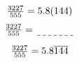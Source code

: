 \documentclass{article}
\newcommand{\wideunderline}[2][2em]{%
  \dashuline{\makebox[\ifdim\width>#1\width\else#1\fi]{#2}}%
}
\begin{document}
\begin{equation}
$$\frac{3227}{555} = 5.8(144)$$
\end{equation} 
\begin{equation} 

$$\frac{3227}{555} = \wideunderline[4em]{} $$
\end{equation}
\begin{equation} 
$$\frac{3227}{555} = 5.8 \overline {144}$$

\end{equation} 
\end{document}
